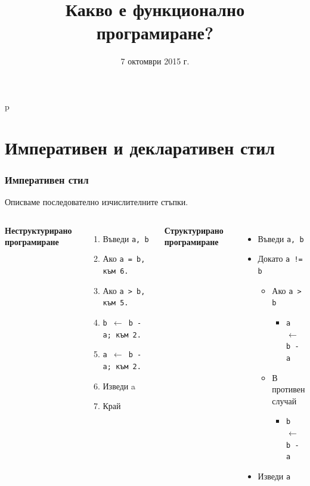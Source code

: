 p\documentclass{beamer}
\title{Какво е функционално програмиране?}
\date{7 октомври 2015 г.}
\begin{document}
\begin{frame}
  \titlepage
\end{frame}

\section*{Императивен и декларативен стил}

\begin{frame}
  \frametitle{Императивен стил}

  Описваме последователно изчислителните стъпки.

  \begin{columns}[t,onlytextwidth]

    \textbf{Неструктурирано програмиране}

    \begin{enumerate}
    \item Въведи \tt a, \tt b
    \item Ако \tt{a = b}, към 6.
    \item Ако \tt{a > b}, към 5.
    \item \tt{b $\leftarrow$ b - a}; към 2.
    \item \tt{a $\leftarrow$ b - a}; към 2.
    \item Изведи a
    \item Край
    \end{enumerate}


    \textbf{Структурирано програмиране}

    \begin{itemize}
    \item Въведи \tt a, \tt b
    \item Докато \tt{a != b}
      \begin{itemize}
      \item Ако \tt{a > b}
        \begin{itemize}
        \item \tt{a $\leftarrow$ b - a}
        \end{itemize}
      \item В противен случай
        \begin{itemize}
        \item \tt{b $\leftarrow$ b - a}
        \end{itemize}
      \end{itemize}
    \item Изведи \tt a
    \end{itemize}

  \end{columns}
\end{frame}
\end{document}
